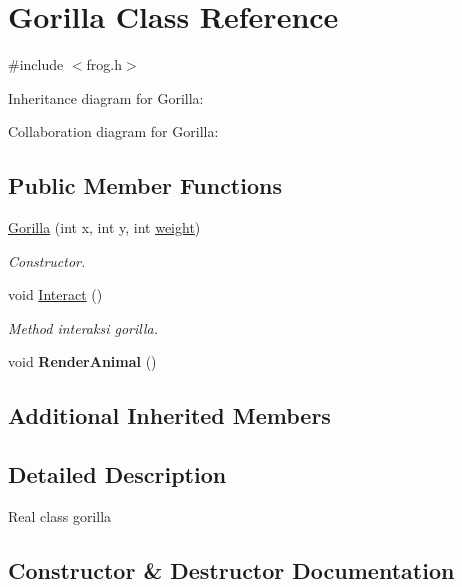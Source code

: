 \hypertarget{classGorilla}{}\section{Gorilla Class Reference}
\label{classGorilla}


{\ttfamily \#include $<$frog.\+h$>$}



Inheritance diagram for Gorilla\+:


Collaboration diagram for Gorilla\+:
\subsection*{Public Member Functions}
\begin{DoxyCompactItemize}
\item 
\hyperlink{classGorilla_a3ca15e178e8ca79e2d1c5be84c9788e9}{Gorilla} (int x, int y, int \hyperlink{classAnimal_a9a3b22f243f7109c57f36b3c660feb6e}{weight})
\begin{DoxyCompactList}\small\item\em Constructor. \end{DoxyCompactList}\item 
void \hyperlink{classGorilla_a466d640592dab0175f0a1c8cc79ec9fa}{Interact} ()\hypertarget{classGorilla_a466d640592dab0175f0a1c8cc79ec9fa}{}\label{classGorilla_a466d640592dab0175f0a1c8cc79ec9fa}

\begin{DoxyCompactList}\small\item\em Method interaksi gorilla. \end{DoxyCompactList}\item 
void {\bfseries Render\+Animal} ()\hypertarget{classGorilla_a8a585eed7b2f546a0745f3c79dfc7e34}{}\label{classGorilla_a8a585eed7b2f546a0745f3c79dfc7e34}

\end{DoxyCompactItemize}
\subsection*{Additional Inherited Members}


\subsection{Detailed Description}
Real class gorilla 

\subsection{Constructor \& Destructor Documentation}
